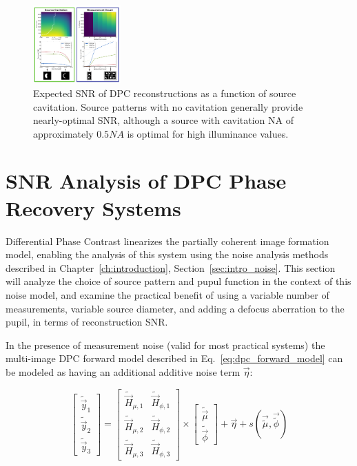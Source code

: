 \begin{figure}
  \label{fig:phase:dpc_cavitation}
    \includegraphics[width=0.3\textwidth]{figures/fig_phase_dpc_optimization_cavitation.pdf}
  \caption{Expected SNR of DPC reconstructions as a function of source cavitation. Source patterns with no cavitation generally provide nearly-optimal SNR, although a source with cavitation NA of approximately $0.5NA$ is optimal for high illuminance values.}
\end{figure}

\section{SNR Analysis of DPC Phase Recovery Systems}
Differential Phase Contrast linearizes the partially coherent image formation model, enabling the analysis of this system using the noise analysis methods described in Chapter~\ref{ch:introduction}, Section~\ref{sec:intro_noise}. This section will analyze the choice of source pattern and pupul function in the context of this noise model, and examine the practical benefit of using a variable number of measurements, variable source diameter, and adding a defocus aberration to the pupil, in terms of reconstruction SNR. 

In the presence of measurement noise (valid for most practical systems) the multi-image DPC forward model described in Eq.~\ref{eq:dpc_forward_model} can be modeled as having an additional additive noise term $\vec{\eta}$: 

\begin{equation}
    \label{eq:dpc_forward_model_noise}
    \begin{bmatrix}\tilde{\vec{y}}_1 \\ \tilde{\vec{y}}_2 \\ \tilde{\vec{y}}_3\end{bmatrix} = \begin{bmatrix}\tilde{\vec{H}}_{\mu, 1} & \tilde{\vec{H}}_{\phi, 1}\\ \tilde{\vec{H}}_{\mu, 2} & \tilde{\vec{H}}_{\phi, 2} \\ \tilde{\vec{H}}_{\mu, 3} & \tilde{\vec{H}}_{\phi, 3}\end{bmatrix} \times \begin{bmatrix}\tilde{\vec{\mu}} \\ \tilde{\vec{\phi}}\end{bmatrix} + \vec{\eta} + s(\vec{\tilde{\mu}}, \vec{\tilde{\phi}})
\end{equation}

